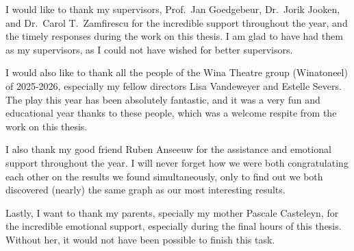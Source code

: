 \documentclass[master=ecws,masteroption=Computational Informatics]{kulemt}
\begin{document}
\begin{preface}
I would like to thank my supervisors, Prof.\ Jan Goedgebeur, Dr.\ Jorik Jooken, and Dr.\ Carol T.\ Zamfirescu for the incredible support throughout the year, and the timely responses during the work on this thesis. I am glad to have had them as my supervisors, as I could not have wished for better supervisors. 

I would also like to thank all the people of the Wina Theatre group (Winatoneel) of 2025-2026, especially my fellow directors Lisa Vandeweyer and Estelle Severs. The play this year has been absolutely fantastic, and it was a very fun and educational year thanks to these people, which was a welcome respite from the work on this thesis.

I also thank my good friend Ruben Anseeuw for the assistance and emotional support throughout the year. I will never forget how we were both congratulating each other on the results we found simultaneously, only to find out we both discovered (nearly) the same graph as our most interesting results.

Lastly, I want to thank my parents, specially my mother Pascale Casteleyn, for the incredible emotional support, especially during the final hours of this thesis. Without her, it would not have been possible to finish this task.
\end{preface}

\tableofcontents*
\end{document}
